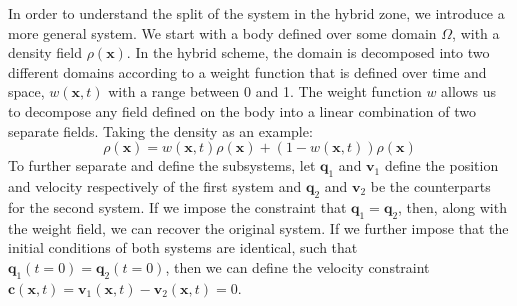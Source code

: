 In order to understand the split of the system in the hybrid zone, we introduce a more general system. We start with a body defined over some domain $\Omega$, with a density field $\rho(\bm{x})$. In the hybrid scheme, the domain is decomposed into two different domains according to a weight function that is defined over time and space, $w(\bm{x},t)$ with a range between 0 and 1. The weight function $w$ allows us to decompose any field defined on the body into a linear combination of two separate fields. Taking the density as an example:
\begin{equation}
\rho(\bm{x})=w(\bm{x},t)\rho(\bm{x}) + (1-w(\bm{x},t))\rho(\bm{x})
\end{equation}
To further separate and define the subsystems, let $\bm{q}_1$ and $\bm{v}_1$ define the position and velocity respectively of the first system and $\bm{q}_2$ and $\bm{v}_2$ be the counterparts for the second system. If we impose the constraint that $\bm{q}_1=\bm{q}_2$, then, along with the weight field, we can recover the original system. If we further impose that the initial conditions of both systems are identical, such that $\bm{q}_1(t=0)=\bm{q}_2(t=0)$, then we can define the velocity constraint $\bm{c}(\bm{x},t)=\bm{v}_1(\bm{x},t)-\bm{v}_2(\bm{x},t)=0$.

